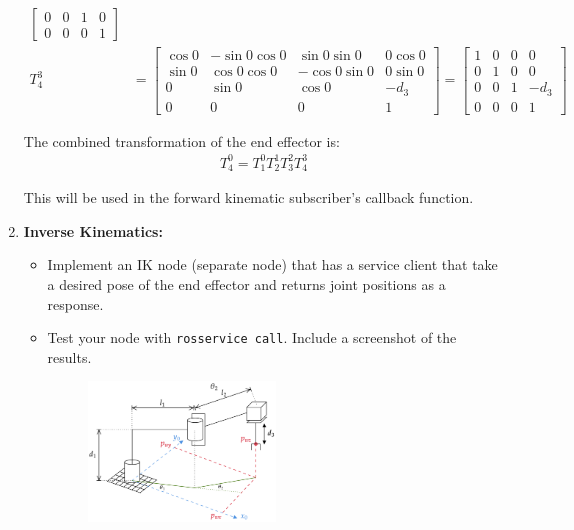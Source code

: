 \documentclass[10pt]{article}
\begin{document}
\begin{enumerate}
\begin{align*}
\begin{bmatrix}
		0 & 0 & 1 & 0 \\
		0 & 0 & 0 & 1
		\end{bmatrix}
		\\
		T_{4}^3 &= \begin{bmatrix}
		\cos 0 & -\sin 0 \cos 0 &\sin 0 \sin 0 & 0 \cos 0 \\
		\sin 0 & \cos 0 \cos 0 & -\cos 0 \sin 0 & 0 \sin 0 \\
		0 & \sin 0 & \cos 0 & -d_3 \\
		0 & 0 & 0 & 1
		\end{bmatrix} = \begin{bmatrix}
		1 & 0 & 0 & 0 \\
		0 & 1 & 0 & 0 \\
		0 & 0 & 1 & -d_3 \\
		0 & 0 & 0 & 1
		\end{bmatrix}
	\end{align*}
	
	The combined transformation of the end effector is:
	\begin{align*}
		T_4^0 = T_1^0 T_2^1 T_3^2 T_4^3
	\end{align*}
	
	This will be used in the forward kinematic subscriber's callback function.
	
	\item \textbf{Inverse Kinematics:}
	
	\begin{itemize}
		\item Implement an IK node (separate node) that has a service client that take a desired pose of the end effector and returns joint positions as a response.
	
		\item Test your node with \texttt{rosservice call}. Include a screenshot of the results.
		
		\begin{figure}[h]
			\centering
			\includegraphics[width=0.5\textwidth]{figures/rrp_IK.png}
		\end{figure}
	
	\end{itemize}
\end{enumerate}
\end{document}
